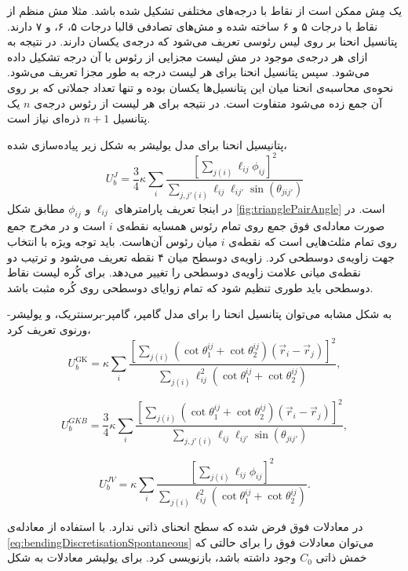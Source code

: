 یک مِش ممکن است از نقاط با درجه‌های مختلفی تشکیل شده باشد. مثلا مش منظم از نقاط با درجات ۵ و ۶ ساخته شده و مش‌های تصادفی قالبا درجات ۵، ۶، و ۷ دارند. پتانسیل انحنا بر روی لیس رئوسی تعریف می‌شود که درجه‌ی یکسان دارند. در نتیجه به ازای هر درجه‌ی موجود در مش  لیست مجزایی از رئوس با آن درجه تشکیل داده می‌شود. سپس پتانسیل انحنا برای هر لیست درجه به طور مجزا تعریف می‌شود. نحوه‌ی محاسبه‌ی انحنا میان این پتانسیل‌ها یکسان بوده و تنها تعداد جملاتی که بر روی آن جمع زده می‌شود متفاوت است. در نتیجه برای هر لیست از رئوس درجه‌ی 
$n$
یک پتانسیل 
$n+1$
ذره‌ای نیاز است.


پتانیسیل  انحنا برای مدل یولیشر به شکل زیر پیاده‌سازی شده،
\begin{equation}
U_b^J=\frac{3}{4}\kappa\sum_i\frac{\left[\sum_{j(i)}\ell_{ij}\phi_{ij}\right]^2}{\sum_{j,j'(i)}\ell_{ij}\ell_{ij'}\sin(\theta_{jij'})}
\label{eq:UbJDiscrete}
\end{equation}
در اینجا تعریف پارامتر‌های 
$\ell_{ij}$
و
$\phi_{ij}$
مطابق شکل 
\ref{fig:trianglePairAngle}
است. در صورت معادله‌ی فوق جمع روی تمام رئوس همسایه نقطه‌ی 
$i$
است و در مخرج جمع روی تمام مثلث‌هایی است که نقطه‌ی 
$i$
میان رئوس آن‌هاست. باید توجه ویژه با انتخاب جهت زاویه‌ی دوسطحی کرد. زاویه‌ی دوسطح میان ۴ نقطه تعریف می‌شود و ترتیب دو نقطه‌ی میانی علامت زاویه‌ی دوسطحی را تغییر می‌دهد. برای کُره لیست نقاط دوسطحی باید طوری تنظیم شود که تمام زوایای دوسطحی روی کُره مثبت باشد.

به شکل مشابه می‌توان پتانسیل انحنا را برای مدل گامپر، گامپر-برسنتریک، و یولیشر-ورنوی تعریف کرد،
\begin{equation}
U_b^\text{GK}=\kappa\sum_i\frac{\left[\sum_{j(i)}(\cot\theta_1^{ij}+\cot\theta_2^{ij})(\vec r_i-\vec r_j)\right]^2}{\sum_{j(i)}\ell_{ij}^2(\cot\theta_1^{ij}+\cot\theta_2^{ij})},
\label{eq:UbGKDiscrete}
\end{equation}

\begin{equation}
U_b^{GKB}=\frac{3}{4}\kappa\sum_i\frac{\left[\sum_{j(i)}(\cot\theta_1^{ij}+\cot\theta_2^{ij})(\vec r_i-\vec r_j)\right]^2}{\sum_{j,j'(i)}\ell_{ij}\ell_{ij'}\sin(\theta_{jij'})},
\end{equation}

\begin{equation}
U_b^{JV}=\kappa\sum_i\frac{\left[\sum_{j(i)}\ell_{ij}\phi_{ij}\right]^2}{\sum_{j(i)}\ell_{ij}^2(\cot\theta_1^{ij}+\cot\theta_2^{ij})}.
\end{equation}

در معادلات فوق فرض شده که سطح انحنای ذاتی ندارد. با استفاده از معادله‌ی 
\ref{eq:bendingDiscretisationSpontaneous}
می‌توان معادلات فوق را برای حالتی که خمش ذاتی 
$C_0$
وجود داشته باشد، بازنویسی کرد. برای یولیشر معادلات به شکل

